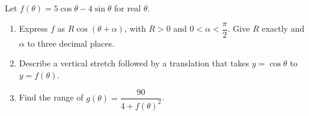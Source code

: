 Let $f(\theta)=5\cos\theta-4\sin\theta$ for real $\theta$.
\begin{enumerate}\item Express $f$ as $R\cos(\theta+\alpha)$, with $R>0$ and $0<\alpha<\dfrac{\pi}{2}$. Give $R$ exactly and $\alpha$ to three decimal places.
\item Describe a vertical stretch followed by a translation that takes $y=\cos\theta$ to $y=f(\theta)$.
\item Find the range of $g(\theta)=\dfrac{90}{4+f(\theta)^2}$.\end{enumerate}
